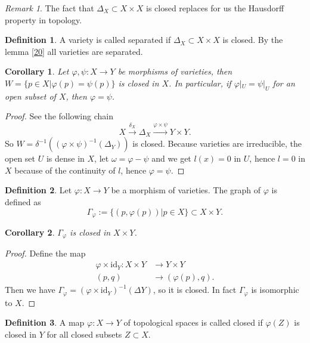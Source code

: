 \documentclass{amsart}
\theoremstyle{plain}
\newtheorem{corollary}{Corollary}
\theoremstyle{definition}
\newtheorem{definition}{Definition}
\theoremstyle{remark}
\newtheorem*{remark}{Remark}
\numberwithin{equation}{section}
\begin{document}
\begin{remark}
	The fact that $ \Delta_X\subset X\times X $ is closed replaces for us the Hausdorff property in topology.
\end{remark}
\begin{definition}
	A variety is called separated if $ \Delta_X\subset X\times X $ is closed. By the lemma \ref{20} all varieties are separated.
\end{definition}
\begin{corollary}
	Let $ \varphi,\psi:X\to Y $ be morphisms of varieties, then $ W=\{ p\in X|\varphi(p)=\psi(p) \} $ is closed in $ X $. In particular, if $ \varphi|_U=\psi|_U $ for an open subset of $ X $, then $ \varphi=\psi $. 
\end{corollary}
\begin{proof}
	See the following chain
	\begin{equation*}
		X\xrightarrow{\delta_X} \Delta_X\xrightarrow{\varphi\times\psi} Y\times Y.
	\end{equation*} 
	So $ W=\delta^{-1}( (\varphi\times\psi)^{-1}(\Delta_Y) ) $ is closed. Because varieties are irreducible, the open set $ U $ is dense in $ X $, let $ \omega = \varphi-\psi $ and we get $ l(x)=0 $ in $ U $, hence $ l=0 $ in $ X $ because of the continuity of $ l $, hence $ \varphi=\psi $.
\end{proof}
\begin{definition}
	Let $ \varphi :X\to Y $ be a morphism of varieties. The graph of $ \varphi $ is defined as 
	\begin{equation}
		\Gamma_{\varphi}:=\{ \left(p,\varphi\left(p\right)\right)| p\in X \}\subset X\times Y.
	\end{equation}
\end{definition}
\begin{corollary}
	$ \Gamma_\varphi $ is closed in $ X\times Y $.
\end{corollary}
\begin{proof}
	Define the map 
	\begin{align*}
		\varphi\times\text{id}_Y : X\times Y & \to Y\times Y\\
		(p,q) & \to (\varphi(p),q).
	\end{align*}
	Then we have $ \Gamma_\varphi = (\varphi\times\text{id}_Y)^{-1}(\Delta Y) $, so it is closed. In fact $ \Gamma_\varphi $ is isomorphic to $ X $. 
\end{proof}
\begin{definition}
	A map $ \varphi:X\to Y $ of topological spaces is called closed if $ \varphi(Z) $ is closed in $ Y $ for all closed subsets $ Z\subset X $.
\end{definition}
\end{document}
